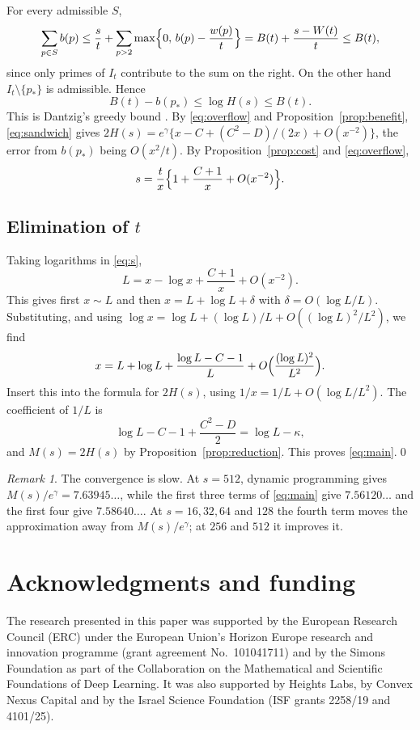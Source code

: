 \documentclass[11pt]{amsart}
\theoremstyle{remark}
\newtheorem{remark}[theorem]{Remark}
\numberwithin{equation}{section}
\begin{document}
For every admissible $S$,
\[
\sum_{p\in S}b(p)\le\frac st+\sum_{p>2}\max\Bigl\{0,\,b(p)-\frac{w(p)}t\Bigr\}
=B(t)+\frac{s-W(t)}{t}\le B(t),
\]
since only primes of $I_t$ contribute to the sum on the right. On the
other hand $I_t\setminus\{p_*\}$ is admissible. Hence
\begin{equation}\label{eq:sandwich}
B(t)-b(p_*)\le\log H(s)\le B(t).
\end{equation}
This is Dantzig's greedy bound \cite{Da57}.
By \eqref{eq:overflow} and Proposition~\ref{prop:benefit},
\eqref{eq:sandwich} gives
$2H(s)=e^\gamma\{x-C+(C^2-D)/(2x)+O(x^{-2})\}$, the error from
$b(p_*)$ being $O(x^2/t)$. By Proposition~\ref{prop:cost} and
\eqref{eq:overflow},
\begin{equation}\label{eq:s}
s=\frac tx\Bigl\{1+\frac{C+1}{x}+O(x^{-2})\Bigr\}.
\end{equation}

\subsection*{Elimination of \texorpdfstring{$t$}{t}}
Taking logarithms in \eqref{eq:s},
\[
L=x-\log x+\frac{C+1}{x}+O(x^{-2}).
\]
This gives first $x\sim L$ and then $x=L+\log L+\delta$ with
$\delta=O(\log L/L)$. Substituting, and using
$\log x=\log L+(\log L)/L+O((\log L)^2/L^2)$, we find
\[
x=L+\log L+\frac{\log L-C-1}{L}+O\Bigl(\frac{(\log L)^2}{L^2}\Bigr).
\]
Insert this into the formula for $2H(s)$, using
$1/x=1/L+O(\log L/L^2)$. The coefficient of $1/L$ is
\[
\log L-C-1+\frac{C^2-D}{2}=\log L-\kappa,
\]
and $M(s)=2H(s)$ by Proposition~\ref{prop:reduction}. This proves
\eqref{eq:main}.\qed

\begin{remark}
The convergence is slow. At $s=512$, dynamic programming gives
$M(s)/e^\gamma=7.63945\ldots$, while the first three terms of
\eqref{eq:main} give $7.56120\ldots$ and the first four give
$7.58640\ldots$. At $s=16,32,64$ and $128$ the fourth term moves the
approximation away from $M(s)/e^\gamma$; at $256$ and $512$ it improves
it.
\end{remark}

\section*{Acknowledgments and funding}

The research presented in this paper was supported by the European Research Council (ERC) under the European Union's Horizon Europe research and innovation programme (grant agreement No.~101041711) and by the Simons Foundation as part of the Collaboration on the Mathematical and Scientific Foundations of Deep Learning. It was also supported by Heights Labs, by Convex Nexus Capital and by the Israel Science Foundation (ISF grants 2258/19 and 4101/25).
\end{document}
